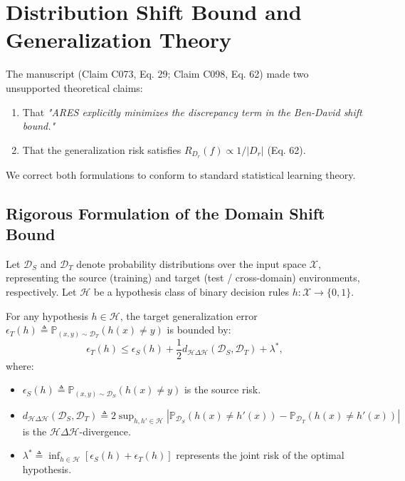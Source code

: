 \section{Distribution Shift Bound and Generalization Theory}
\label{sec:shift}

The manuscript (Claim C073, Eq. 29; Claim C098, Eq. 62) made two unsupported theoretical claims:
\begin{enumerate}
    \item That \emph{"ARES explicitly minimizes the discrepancy term in the Ben-David shift bound."}
    \item That the generalization risk satisfies $R_{D_r}(f) \propto 1/|D_r|$ (Eq. 62).
\end{enumerate}
We correct both formulations to conform to standard statistical learning theory.

\subsection{Rigorous Formulation of the Domain Shift Bound}
Let $\mathcal{D}_S$ and $\mathcal{D}_T$ denote probability distributions over the input space $\mathcal{X}$, representing the source (training) and target (test / cross-domain) environments, respectively. Let $\mathcal{H}$ be a hypothesis class of binary decision rules $h: \mathcal{X} \to \{0, 1\}$.

\begin{theorem}
\label{thm:ben_david}
For any hypothesis $h \in \mathcal{H}$, the target generalization error $\epsilon_T(h) \triangleq \mathbb{P}_{(x, y) \sim \mathcal{D}_T}(h(x) \ne y)$ is bounded by:
\begin{equation}
\label{eq:ben_david_bound}
\epsilon_T(h) \le \epsilon_S(h) + \frac{1}{2} d_{\mathcal{H}\Delta\mathcal{H}}(\mathcal{D}_S, \mathcal{D}_T) + \lambda^*,
\end{equation}
where:
\begin{itemize}
    \item $\epsilon_S(h) \triangleq \mathbb{P}_{(x, y) \sim \mathcal{D}_S}(h(x) \ne y)$ is the source risk.
    \item $d_{\mathcal{H}\Delta\mathcal{H}}(\mathcal{D}_S, \mathcal{D}_T) \triangleq 2 \sup_{h, h' \in \mathcal{H}} |\mathbb{P}_{\mathcal{D}_S}(h(x) \ne h'(x)) - \mathbb{P}_{\mathcal{D}_T}(h(x) \ne h'(x))|$ is the $\mathcal{H}\Delta\mathcal{H}$-divergence.
    \item $\lambda^* \triangleq \inf_{h \in \mathcal{H}} [\epsilon_S(h) + \epsilon_T(h)]$ represents the joint risk of the optimal hypothesis.
\end{itemize}
\end{theorem}

